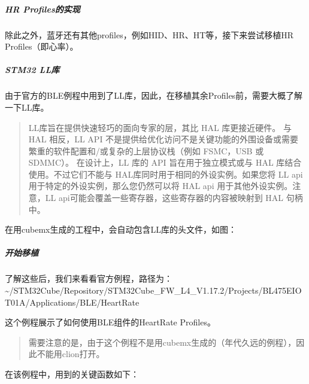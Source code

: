\documentclass[a4paper,12pt,english]{sphinxmanual}
\begin{document}
\sphinxAtStartPar
{}


\subparagraph{HR Profiles的实现}
\label{\detokenize{exp-stm32/ble/Profiles:hr-profiles}}
\sphinxAtStartPar
除此之外，蓝牙还有其他profiles，例如HID、HR、HT等，接下来尝试移植HR Profiles（即心率）。


\subparagraph{STM32 LL库}
\label{\detokenize{exp-stm32/ble/Profiles:stm32-ll}}
\sphinxAtStartPar
由于官方的BLE例程中用到了LL库，因此，在移植其余Profiles前，需要大概了解一下LL库。
\begin{quote}

\sphinxAtStartPar
LL库旨在提供快速轻巧的面向专家的层，其比 HAL 库更接近硬件。 与 HAL 相反，LL API 不是提供给优化访问不是关键功能的外围设备或需要繁重的软件配置和/或复杂的上层协议栈（例如 FSMC，USB 或 SDMMC）。
在设计上，LL 库的 API 旨在用于独立模式或与 HAL 库结合使用。不过它们不能与 HAL库同时用于相同的外设实例。如果您将 LL api 用于特定的外设实例，那么您仍然可以将 HAL api 用于其他外设实例。注意，LL api可能会覆盖一些寄存器，这些寄存器的内容被映射到 HAL 句柄中。
\end{quote}

\sphinxAtStartPar
在用cubemx生成的工程中，会自动包含LL库的头文件，如图：

\sphinxAtStartPar
{}


\subparagraph{开始移植}
\label{\detokenize{exp-stm32/ble/Profiles:id8}}
\sphinxAtStartPar
了解这些后，我们来看看官方例程，路径为：\textasciitilde{}/STM32Cube/Repository/STM32Cube\_FW\_L4\_V1.17.2/Projects/B\sphinxhyphen{}L475E\sphinxhyphen{}IOT01A/Applications/BLE/HeartRate

\sphinxAtStartPar
这个例程展示了如何使用BLE组件的HeartRate Profiles。
\begin{quote}

\sphinxAtStartPar
需要注意的是，由于这个例程不是用cubemx生成的（年代久远的例程），因此不能用clion打开。
\end{quote}

\sphinxAtStartPar
在该例程中，用到的关键函数如下：
\end{document}
